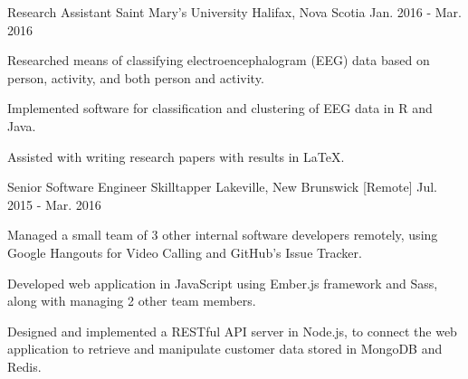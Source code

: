 

\begin{cventries}

  \cventry
    {Research Assistant} %
    {Saint Mary's University} %
    {Halifax, Nova Scotia} %
    {Jan. 2016 - Mar. 2016} %
    {
      \begin{cvitems} %
        \item {Researched means of classifying electroencephalogram (EEG) data based on person, activity, and both person and activity.}
        \item {Implemented software for classification and clustering of EEG data in R and Java.}
        \item {Assisted with writing research papers with results in LaTeX.}
      \end{cvitems}
    }

  \cventry
    {Senior Software Engineer} %
    {Skilltapper} %
    {Lakeville, New Brunswick [Remote]} %
    {Jul. 2015 - Mar. 2016} %
    {
      \begin{cvitems} %
        \item {Managed a small team of 3 other internal software developers remotely, using Google Hangouts for Video Calling and GitHub's Issue Tracker.}
        \item {Developed web application in JavaScript using Ember.js framework and Sass, along with managing 2 other team members.}
        \item {Designed and implemented a RESTful API server in Node.js, to connect the web application to retrieve and manipulate customer data stored in MongoDB and Redis.}
      \end{cvitems}
    }


\end{cventries}
